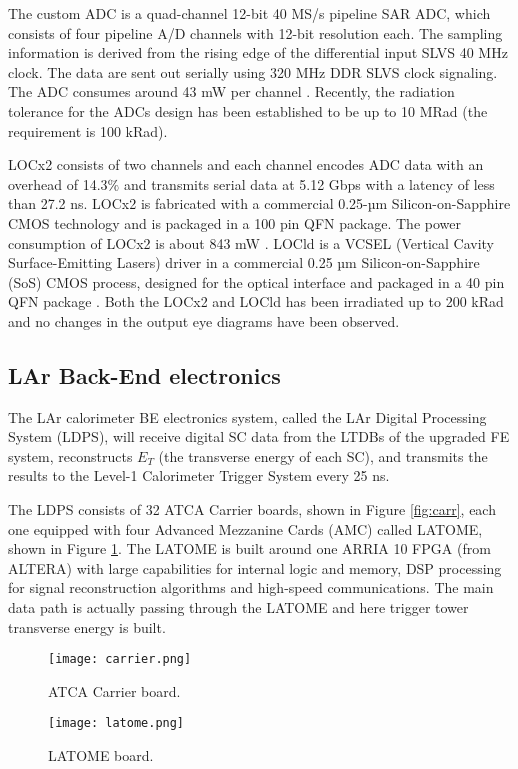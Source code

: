 \documentclass{llncs}
\begin{document}
The custom ADC is a quad-channel 12-bit 40 MS/s pipeline SAR ADC, which consists of four pipeline A/D channels with 12-bit resolution each. The sampling information is derived from the rising edge of the differential input SLVS 40 MHz clock. The data are sent out serially using 320 MHz DDR SLVS clock signaling. The ADC consumes around 43 mW per channel \cite{Xu:2229579}. Recently, the radiation tolerance for the ADCs design has been established to be up to 10 MRad (the requirement is 100 kRad).

LOCx2 consists of two channels and each channel encodes ADC data with an overhead of 14.3$\%$ and transmits serial data at 5.12 Gbps with a latency of less than 27.2 ns. LOCx2 is fabricated with a commercial 0.25-µm Silicon-on-Sapphire CMOS technology and is packaged in a 100 pin QFN package. The power consumption of LOCx2 is about 843 mW \cite{1748-0221-11-02-C02013}.
LOCld is a VCSEL (Vertical Cavity Surface-Emitting Lasers) driver in a commercial 0.25 µm Silicon-on-Sapphire (SoS) CMOS process, designed for the optical interface and packaged in a 40 pin QFN package \cite{1748-0221-8-01-C01031}. 
Both the LOCx2 and LOCld has been irradiated up to 200 kRad and no changes in the output eye diagrams have been observed.

\subsection{LAr Back-End electronics}
The LAr calorimeter BE electronics system, called the LAr Digital Processing System (LDPS), will receive digital SC data from the LTDBs of the upgraded FE system, reconstructs $E_{T}$ (the transverse energy of each SC), and transmits the results to the Level-1 Calorimeter Trigger System every 25 ns. 

The LDPS consists of 32 ATCA Carrier boards, shown in Figure \ref{fig:carr}, each one equipped with four Advanced Mezzanine Cards (AMC) called LATOME, shown in Figure \ref{fig:lat}. 
The LATOME is built around one ARRIA 10 FPGA (from ALTERA) with large capabilities for internal logic and memory, DSP processing for signal reconstruction algorithms and high-speed communications. The main data path is actually passing through the LATOME and here trigger tower transverse energy is built.
\begin{figure}[ht]
\begin{minipage}[t]{0.45\textwidth}
		\centering
		\texttt{[image: carrier.png]}
		\caption{ATCA Carrier board.}
		\label{fig:carr}
\end{minipage}
\begin{minipage}[t]{0.55\textwidth}
		\centering
		\texttt{[image: latome.png]}
		\caption{LATOME board.}
		\label{fig:lat}
\end{minipage}
\end{figure}
\end{document}
